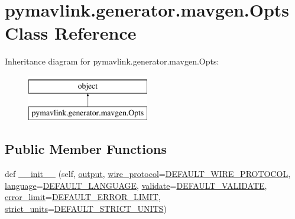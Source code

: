 \hypertarget{classpymavlink_1_1generator_1_1mavgen_1_1Opts}{}\section{pymavlink.\+generator.\+mavgen.\+Opts Class Reference}
\label{classpymavlink_1_1generator_1_1mavgen_1_1Opts}
Inheritance diagram for pymavlink.\+generator.\+mavgen.\+Opts\+:\begin{figure}[H]
\begin{center}
\leavevmode
\includegraphics[height=2.000000cm]{classpymavlink_1_1generator_1_1mavgen_1_1Opts}
\end{center}
\end{figure}
\subsection*{Public Member Functions}
\begin{DoxyCompactItemize}
\item 
def \mbox{\hyperlink{classpymavlink_1_1generator_1_1mavgen_1_1Opts_a372b458daea9975d7069803324cbb6ee}{\+\_\+\+\_\+init\+\_\+\+\_\+}} (self, \mbox{\hyperlink{classpymavlink_1_1generator_1_1mavgen_1_1Opts_aa171d220e26278a358d1808fe78e4a55}{output}}, \mbox{\hyperlink{classpymavlink_1_1generator_1_1mavgen_1_1Opts_af1a93e2fc4904c4e01985743105599f3}{wire\+\_\+protocol}}=\mbox{\hyperlink{namespacepymavlink_1_1generator_1_1mavgen_abf74e4464cc281c1350dae3930435bed}{D\+E\+F\+A\+U\+L\+T\+\_\+\+W\+I\+R\+E\+\_\+\+P\+R\+O\+T\+O\+C\+OL}}, \mbox{\hyperlink{classpymavlink_1_1generator_1_1mavgen_1_1Opts_ae98d3c4280d0f15292776a6ad5b3fc0b}{language}}=\mbox{\hyperlink{namespacepymavlink_1_1generator_1_1mavgen_a65f98f41c53e5f7e200dc0d29d5c145d}{D\+E\+F\+A\+U\+L\+T\+\_\+\+L\+A\+N\+G\+U\+A\+GE}}, \mbox{\hyperlink{classpymavlink_1_1generator_1_1mavgen_1_1Opts_a44cf03993910729c1748cce06e909e06}{validate}}=\mbox{\hyperlink{namespacepymavlink_1_1generator_1_1mavgen_aee44fcfd95ce6860ecc9b4dc638b853b}{D\+E\+F\+A\+U\+L\+T\+\_\+\+V\+A\+L\+I\+D\+A\+TE}}, \mbox{\hyperlink{classpymavlink_1_1generator_1_1mavgen_1_1Opts_aa2928bf27412e4e9c0e58c74268321d1}{error\+\_\+limit}}=\mbox{\hyperlink{namespacepymavlink_1_1generator_1_1mavgen_abd60aefad7485fc1278640acaa724ee5}{D\+E\+F\+A\+U\+L\+T\+\_\+\+E\+R\+R\+O\+R\+\_\+\+L\+I\+M\+IT}}, \mbox{\hyperlink{classpymavlink_1_1generator_1_1mavgen_1_1Opts_a53768c5e54dd92e2e66283b2b559f7b5}{strict\+\_\+units}}=\mbox{\hyperlink{namespacepymavlink_1_1generator_1_1mavgen_aec8e6fd33aa2b796dbad37253958f2b2}{D\+E\+F\+A\+U\+L\+T\+\_\+\+S\+T\+R\+I\+C\+T\+\_\+\+U\+N\+I\+TS}})
\end{DoxyCompactItemize}
